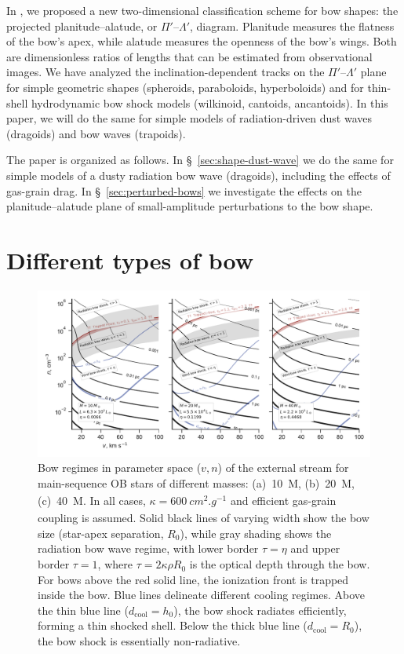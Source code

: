 In \citet[][hereafter \PaperI{}]{Tarango-Yong:2018a}, we proposed a
new two-dimensional classification scheme for bow shapes: the
projected planitude--alatude, or \(\Pi'\)--\(\Lambda'\), diagram.  Planitude
measures the flatness of the bow's apex, while alatude measures the
openness of the bow's wings.  Both are dimensionless ratios of lengths
that can be estimated from observational images.  We have analyzed the
inclination-dependent tracks on the \(\Pi'\)--\(\Lambda'\) plane for simple
geometric shapes (spheroids, paraboloids, hyperboloids) and for
thin-shell hydrodynamic bow shock models (wilkinoid, cantoids,
ancantoids).  In this paper, we will do the same for simple models of
radiation-driven dust waves (dragoids) and bow waves (trapoids).

The paper is organized as follows.
%
In \S~\ref{sec:shape-dust-wave} we do the same for simple models of a
dusty radiation bow wave (dragoids), including the effects of
gas-grain drag.
%
In \S~\ref{sec:perturbed-bows} we investigate the effects on the
planitude--alatude plane of small-amplitude perturbations to the bow
shape.
%


\section{Different types of bow}
\label{sec:different-types-bow}

\begin{figure}
  \includegraphics[width=\linewidth]{figs/zones-v-n-plane}
  \caption{Bow regimes in parameter space (\(v, n\)) of the external
    stream for main-sequence OB stars of different masses:
    (a)~\SI{10}{M_\odot}, (b)~\SI{20}{M_\odot}, (c)~\SI{40}{M_\odot}.  In all
    cases, \(\kappa = \SI{600}{cm^2.g^{-1}}\) and efficient gas-grain
    coupling is assumed. Solid black lines of varying width show the
    bow size (star-apex separation, \(R_0\)), while gray shading shows
    the radiation bow wave regime, with lower border \(\tau = \eta\) and
    upper border \(\tau = 1\), where \(\tau = 2 \kappa \rho R_0\) is the optical
    depth through the bow.  For bows above the red solid line, the
    ionization front is trapped inside the bow.  Blue lines delineate
    different cooling regimes.  Above the thin blue line
    (\(d_{\text{cool}} = h_0\)), the bow shock radiates efficiently,
    forming a thin shocked shell.  Below the thick blue line
    (\(d_{\text{cool}} = R_0\)), the bow shock is essentially
    non-radiative.}
  \label{fig:zones-v-n-plane}
\end{figure}

